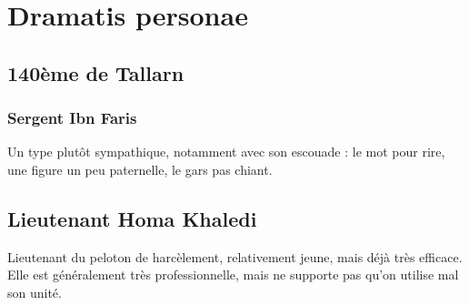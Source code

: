 \documentclass[10pt,a4paper]{book}
\begin{document}
\chapter{Dramatis personae}
\section{140ème de Tallarn}
\subsection{Sergent Ibn Faris}
Un type plutôt sympathique, notamment avec son escouade : le mot pour rire, une figure un peu paternelle, le gars pas chiant.
\section{Lieutenant Homa Khaledi}
Lieutenant du peloton de harcèlement, relativement jeune, mais déjà très efficace. Elle est généralement très professionnelle, mais ne supporte pas qu'on utilise mal son unité.
\end{document}
